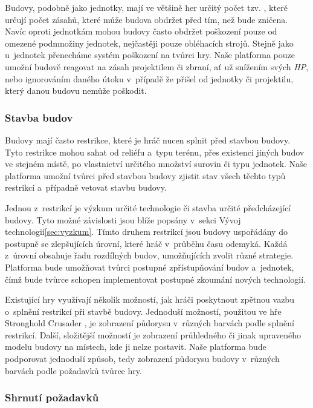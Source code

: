 Budovy, podobně jako jednotky, mají ve většině her určitý počet tzv.  , které určují počet zásahů, které může budova obdržet před tím, než bude zničena. Navíc oproti jednotkám mohou budovy často obdržet poškození pouze od omezené podmnožiny jednotek, nejčastěji pouze obléhacích strojů. Stejně jako u~jednotek přenecháme systém poškození na tvůrci hry. Naše platforma pouze umožní budově reagovat na zásah projektilem či zbraní, ať už snížením svých \textit{HP}, nebo ignorováním daného útoku v~případě že přišel od jednotky či projektilu, který danou budovu nemůže poškodit.


\subsubsection{Stavba budov}
\done
{}
Budovy mají často restrikce, které je hráč nucen splnit před stavbou budovy. Tyto restrikce mohou sahat od reliéfu a~typu terénu, přes existenci jiných budov ve stejném místě, po vlastnictví určitého množství surovin či typu jednotek. Naše platforma umožní tvůrci před stavbou budovy zjistit stav všech těchto typů restrikcí a~případně vetovat stavbu budovy. 

Jednou z~restrikcí je výzkum určité technologie či stavba určité předcházející budovy. Tyto možné závislosti jsou blíže popsány v~sekci Vývoj technologií\ref{sec:vyzkum}. Tímto druhem restrikcí jsou budovy uspořádány do postupně se zlepšujících úrovní, které hráč v~průběhu času odemyká. Každá z~úrovní obsahuje řadu rozdílných budov, umožňujících zvolit různé strategie. Platforma bude umožňovat tvůrci postupné zpřístupňování budov a~jednotek, čímž bude tvůrce schopen implementovat postupné zkoumání nových technologií.

Existující hry využívají několik možností, jak hráči poskytnout zpětnou vazbu o~splnění restrikcí při stavbě budovy. Jednoduší možností, použitou ve hře Stronghold Crusader \citep{site:strongholdcrus}, je zobrazení půdorysu v~různých barvách podle splnění restrikcí. Další, složitější možností je zobrazení průhledného či jinak upraveného modelu budovy na místech, kde ji nelze postavit.  Naše platforma bude podporovat jednoduší způsob, tedy zobrazení půdorysu budovy v~různých barvách podle požadavků tvůrce hry.

\subsubsection{Shrnutí požadavků}

